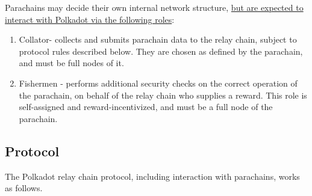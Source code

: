 Parachains may decide their own internal network structure, \uline{but are expected to interact with Polkadot via the following roles}:

\begin{enumerate}
\item Collator\footnotemark[1] - collects and submits parachain data to the relay chain, subject to protocol rules described below. They are chosen as defined by the parachain, and must be full nodes of it.
\item Fishermen - performs additional security checks on the correct operation of the parachain, on behalf of the relay chain who supplies a reward. This role is self-assigned and reward-incentivized, and must be a full node of the parachain.
\end{enumerate}


\subsection{Protocol}

The Polkadot relay chain protocol, including interaction with parachains, works as follows.

